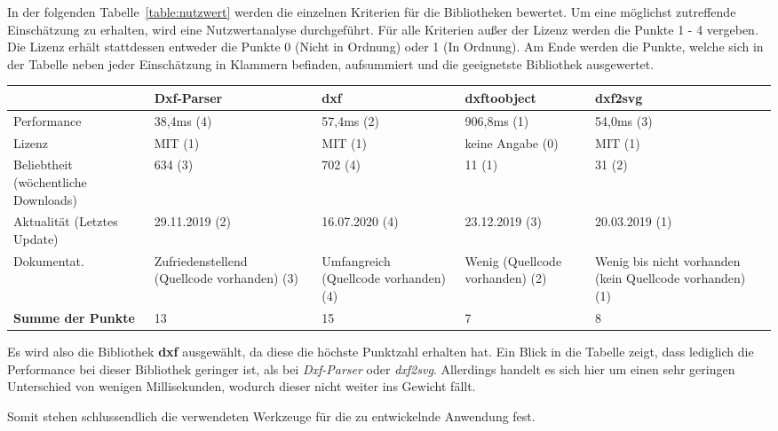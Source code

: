 In der folgenden Tabelle~\ref{table:nutzwert} werden die einzelnen Kriterien für die Bibliotheken bewertet.
Um eine möglichst zutreffende Einschätzung zu erhalten, wird eine Nutzwertanalyse durchgeführt.
Für alle Kriterien außer der Lizenz werden die Punkte 1 - 4 vergeben.
Die Lizenz erhält stattdessen entweder die Punkte 0 (Nicht in Ordnung) oder 1 (In Ordnung).
Am Ende werden die Punkte, welche sich in der Tabelle neben jeder Einschätzung in Klammern befinden, aufsummiert und die geeignetste Bibliothek ausgewertet.

\begin{center}
    \scriptsize
    \begin{supertabular}{ p{1.4cm}|p{1.6cm}|p{1.5cm}|p{1.3cm}|p{1.3cm} }
        \label{table:nutzwert}
        & \textbf{Dxf-Parser} & \textbf{dxf} & \textbf{dxftoobject} & \textbf{dxf2svg} \\
        \hline
        Performance & 38,4ms (4) & 57,4ms (2) & 906,8ms (1) & 54,0ms (3) \\
        Lizenz & MIT (1) & MIT (1) & keine Angabe (0) & MIT (1) \\
        Beliebtheit (wöchentliche Downloads) & 634 (3) & 702 (4) & 11 (1) & 31 (2) \\
        Aktualität (Letztes Update) & 29.11.2019 (2) & 16.07.2020 (4) & 23.12.2019 (3) & 20.03.2019 (1) \\
        Dokumentat. & Zufriedenstellend (Quellcode vorhanden) (3) & Umfangreich (Quellcode vorhanden) (4) & Wenig (Quellcode vorhanden) (2) & Wenig bis nicht vorhanden (kein Quellcode vorhanden) (1) \\
        \hline
        \textbf{Summe der Punkte} & 13 & 15 & 7 & 8 \\
    \end{supertabular}
\end{center}

Es wird also die Bibliothek \textbf{dxf} ausgewählt, da diese die höchste Punktzahl erhalten hat.
Ein Blick in die Tabelle zeigt, dass lediglich die Performance bei dieser Bibliothek geringer ist, als bei \textit{Dxf-Parser} oder \textit{dxf2svg}.
Allerdings handelt es sich hier um einen sehr geringen Unterschied von wenigen Millisekunden, wodurch dieser nicht weiter ins Gewicht fällt.

Somit stehen schlussendlich die verwendeten Werkzeuge für die zu entwickelnde Anwendung fest.

